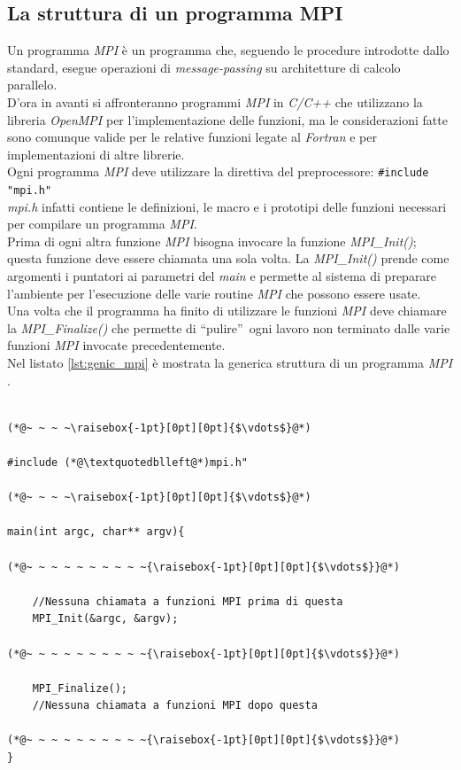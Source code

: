 \subsection{La struttura di un programma MPI}
Un programma \textit{MPI} è un programma che, seguendo le procedure introdotte dallo standard, esegue operazioni di \textit{message-passing} su architetture di calcolo parallelo.\\
D'ora in avanti si affronteranno programmi \textit{MPI} in \textit{C/C++} che utilizzano la libreria \emph{OpenMPI} \cite{open_mpi} per l'implementazione delle funzioni, ma le considerazioni fatte sono comunque valide per le relative funzioni legate al \textit{Fortran} e per implementazioni di altre librerie.\\
Ogni programma \textit{MPI} deve utilizzare la direttiva del preprocessore: \lstinline{#include "mpi.h"}\\
\textit{mpi.h} infatti contiene le definizioni, le macro e i prototipi delle funzioni necessari per compilare un programma \textit{MPI}.\\
Prima di ogni altra funzione \textit{MPI} bisogna invocare la funzione \textit{MPI\_Init()}; questa funzione deve essere chiamata una sola volta. La \textit{MPI\_Init()} prende come argomenti i puntatori ai parametri del \textit{main} e permette al sistema di preparare l'ambiente per l'esecuzione delle varie routine \textit{MPI} che possono essere usate.\\
Una volta che il programma ha finito di utilizzare le funzioni \textit{MPI} deve chiamare la \textit{MPI\_Finalize()} che permette di \textquotedblleft pulire\textquotedblright~ogni lavoro non terminato dalle varie funzioni \textit{MPI} invocate precedentemente.\\
Nel listato \ref{lst:genic_mpi} è mostrata la generica struttura di un programma \textit{MPI} \cite{mpi_general}.\\
\begin{lstlisting}[label={lst:genic_mpi},
caption={Programma MPI generico}]

(*@~ ~ ~ ~\raisebox{-1pt}[0pt][0pt]{$\vdots$}@*)

#include (*@\textquotedblleft@*)mpi.h"

(*@~ ~ ~ ~\raisebox{-1pt}[0pt][0pt]{$\vdots$}@*)

main(int argc, char** argv){

(*@~ ~ ~ ~ ~ ~ ~ ~ ~ ~{\raisebox{-1pt}[0pt][0pt]{$\vdots$}}@*)

    //Nessuna chiamata a funzioni MPI prima di questa
    MPI_Init(&argc, &argv);

(*@~ ~ ~ ~ ~ ~ ~ ~ ~ ~{\raisebox{-1pt}[0pt][0pt]{$\vdots$}}@*)

    MPI_Finalize();
    //Nessuna chiamata a funzioni MPI dopo questa

(*@~ ~ ~ ~ ~ ~ ~ ~ ~ ~{\raisebox{-1pt}[0pt][0pt]{$\vdots$}}@*)
}

\end{lstlisting}
